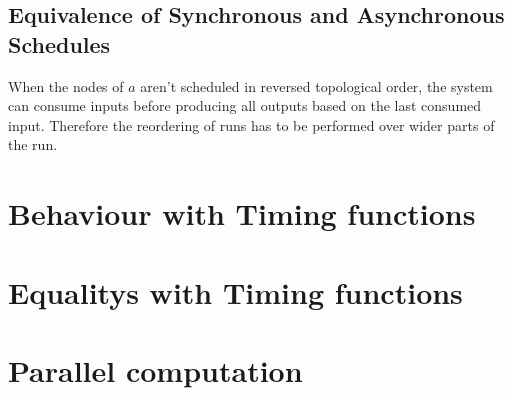 \subsection{Equivalence of Synchronous and Asynchronous Schedules}
\label{sec:concepts:equivalence_without_timing:sync_async}

When the nodes of \(a\) aren't scheduled in reversed topological order, the system can consume inputs before producing all outputs based on the last consumed input.
Therefore the reordering of runs has to be performed over wider parts of the run.

\section{Behaviour with Timing functions}
\label{sec:concepts:behaviour_with_timing}
\section{Equalitys with Timing functions}
\label{sec:concepts:equivalence_with_timing}
\section{Parallel computation}
